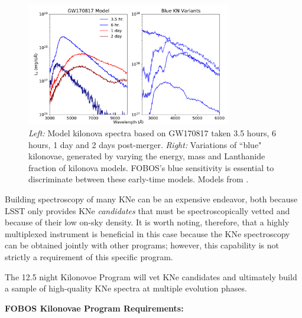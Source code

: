 \documentclass[11pt,a4paper,twoside,onecolumn,openany,final,oldfontcommands]{memoir}
\begin{document}

\begin{figure}
\begin{center}
\includegraphics[width=0.8\textwidth]{figs/kn_fobos.pdf}
\end{center}
\caption[Model spectra of kilonovae]{\textit{Left:} Model kilonova spectra based on GW170817 taken 3.5 hours, 6 hours, 1 day and 2 days post-merger. \textit{Right:} Variations of ``blue" kilonovae, generated by varying the energy, mass and Lanthanide fraction of kilonova models. FOBOS's blue sensitivity is essential to discriminate between these early-time models. Models from \citet{kasen2017}.}
\label{fig:kilonova}    
\end{figure}

Building spectroscopy of many KNe can be an expensive endeavor, both because LSST only provides KNe \textit{candidates} that must be spectroscopically vetted and because of their low on-sky density.  It is worth noting, therefore, that a highly multiplexed instrument is beneficial in this case because the KNe spectroscopy can be obtained jointly with other programs; however, this capability is not strictly a requirement of this specific program.

The 12.5 night Kilonovoe Program will vet KNe candidates and ultimately build a sample of high-quality KNe spectra at multiple evolution phases.  

\medskip
\noindent \textbf{FOBOS Kilonovae Program Requirements:}
\end{document}
